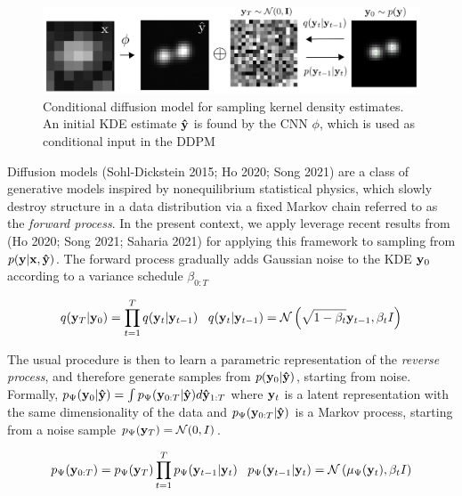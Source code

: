 \documentclass{article}
\begin{document}
\begin{figure}
\includegraphics[scale=4.5]{Denoise.png}
\caption{Conditional diffusion model for sampling kernel density estimates. An initial KDE estimate $\bold{\hat{y}}$ is found by the CNN $\phi$, which is used as conditional input in the DDPM}
\end{figure}

Diffusion models (Sohl-Dickstein 2015; Ho 2020; Song 2021) are a class of generative models inspired by nonequilibrium statistical physics, which slowly destroy structure in a data distribution via a fixed Markov chain referred to as the \emph{forward process}. In the present context, we apply leverage recent results from (Ho 2020; Song 2021; Saharia 2021) for applying this framework to sampling from $p(\bold{y}|\bold{x},\bold{\hat{y}})$. The forward process gradually adds Gaussian noise to the KDE $\bold{y}_0$ according to a variance schedule $\beta_{0:T}$

\begin{equation}
q(\bold{y}_{T}|\bold{y}_{0}) = \prod_{t=1}^{T}q(\bold{y}_{t}|\bold{y}_{t-1}) \;\;\; q(\bold{y}_{t}|\bold{y}_{t-1}) = \mathcal{N}\left(\sqrt{1-\beta_{t}}\bold{y}_{t-1},\beta_t I\right)
\end{equation}

The usual procedure is then to learn a parametric representation of the \emph{reverse process}, and therefore generate samples from  $p(\bold{y}_{0}|\bold{\hat{y}})$, starting from noise. Formally, $p_{\Psi}(\bold{y}_{0}|\bold{\hat{y}}) = \int p_{\Psi}(\bold{y}_{0:T}|\bold{\hat{y}})d\bold{\hat{y}}_{1:T}$ where $\bold{y}_{t}$ is a latent representation with the same dimensionality of the data and $p_{\Psi}(\bold{y}_{0:T}|\bold{\hat{y}})$ is a Markov process, starting from a noise sample $p_{\Psi}(\bold{y}_{T}) = \mathcal{N}(0,I)$. 

\begin{equation}
p_{\Psi}(\bold{y}_{0:T}) = p_{\Psi}(\bold{y}_{T})\prod_{t=1}^{T} p_{\Psi}(\bold{y}_{t-1}|\bold{y}_{t}) \;\;\; p_{\Psi}(\bold{y}_{t-1}|\bold{y}_{t}) = \mathcal{N}\left(\mu_{\Psi}(\bold{y}_{t}),\beta_{t}I\right)
\end{equation}
\end{document}
